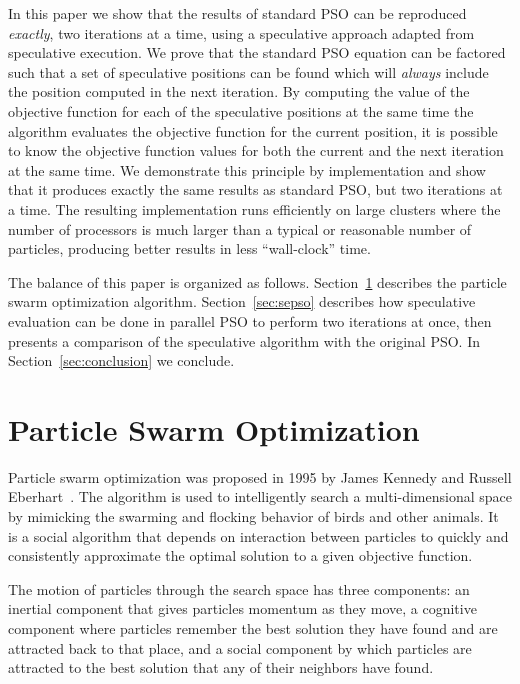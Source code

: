\documentclass{llncs}
\renewcommand{\sec}[1]{Section~\ref{sec:#1}}
\begin{document}
In this paper we show that the results of standard PSO can be reproduced
\emph{exactly}, two iterations at a time, using a speculative approach adapted
from speculative execution. We prove that the standard PSO equation can be
factored such that a set of speculative positions can be found which will
\emph{always} include the position computed in the next iteration.  By
computing the value of the objective function for each of the speculative
positions at the same time the algorithm evaluates the objective function for
the current position, it is possible to know the objective function values for
both the current and the next iteration at the same time.  We demonstrate this
principle by implementation and show that it produces exactly the same results
as standard PSO, but two iterations at a time.  The resulting implementation
runs efficiently on large clusters where the number of processors is much
larger than a typical or reasonable number of particles, producing better
results in less ``wall-clock'' time.

The balance of this paper is organized as follows. \sec{pso} describes the
particle swarm optimization algorithm.  \sec{sepso} describes how speculative
evaluation can be done in parallel PSO to perform two iterations at once, then
presents a comparison of the speculative algorithm with the original PSO.  In
\sec{conclusion} we conclude.

\section{Particle Swarm Optimization}
\label{sec:pso}

Particle swarm optimization was proposed in 1995 by James Kennedy and Russell
Eberhart~\cite{kennedy-1995-particle-swarm-optimization}.  The algorithm is
used to intelligently search a multi-dimensional space by mimicking the
swarming and flocking behavior of birds and other animals. It is a social
algorithm that depends on interaction between particles to quickly and
consistently approximate the optimal solution to a given objective function.

The motion of particles through the search space has three components: an
inertial component that gives particles momentum as they move, a cognitive
component where particles remember the best solution they have found and are
attracted back to that place, and a social component by which particles are
attracted to the best solution that any of their neighbors have found.
\end{document}
